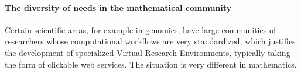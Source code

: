 



\paragraph{The diversity of needs in the mathematical community}

Certain scientific areas, for example in genomics, have large
communities of researchers whose computational workflows are very
standardized, which justifies the development of specialized Virtual
Research Environments, typically taking the form of clickable web
services. The situation is very different in mathematics.

